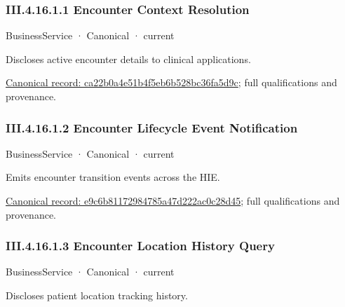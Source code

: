 \subsubsection*{III.4.16.1.1 Encounter Context Resolution}
\label{navigation:III.4.16.1.1}

\label{element:ca22b0a4e51b4f5eb6b528bc36fa5d9c}
{\small BusinessService · Canonical · current}\par

Discloses active encounter details to clinical applications.


{\footnotesize \href{../../../../continuum/business/business-service/ca22b0a4e51b4f5eb6b528bc36fa5d9c.md}{Canonical record: ca22b0a4e51b4f5eb6b528bc36fa5d9c}; full qualifications and provenance.}\par
\subsubsection*{III.4.16.1.2 Encounter Lifecycle Event Notification}
\label{navigation:III.4.16.1.2}

\label{element:e9c6b81172984785a47d222ac0c28d45}
{\small BusinessService · Canonical · current}\par

Emits encounter transition events across the HIE.


{\footnotesize \href{../../../../continuum/business/business-service/e9c6b81172984785a47d222ac0c28d45.md}{Canonical record: e9c6b81172984785a47d222ac0c28d45}; full qualifications and provenance.}\par
\subsubsection*{III.4.16.1.3 Encounter Location History Query}
\label{navigation:III.4.16.1.3}

\label{element:5f0f9fec1d16458aaf914b0957793953}
{\small BusinessService · Canonical · current}\par

Discloses patient location tracking history.


